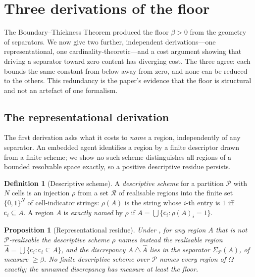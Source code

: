 \documentclass[11pt,twocolumn,a4paper]{article}
\theoremstyle{thmstyle}
\newtheorem{proposition}[theorem]{Proposition}
\theoremstyle{definition}
\newtheorem{definition}[theorem]{Definition}
\theoremstyle{remark}
\newcommand{\Space}{\Omega}
\newcommand{\thick}{\beta}
\newcommand{\Part}{\mathscr{P}}
\newcommand{\cell}{\mathsf{c}}
\begin{document}
\section{Three derivations of the floor}
\label{sec:floor}

The Boundary--Thickness Theorem produced the floor $\thick>0$ from the geometry
of separators. We now give two further, independent derivations---one
representational, one cardinality-theoretic---and a cost argument showing that
driving a separator toward zero content has diverging cost. The three agree:
each bounds the same constant from below away from zero, and none can be reduced
to the others. This redundancy is the paper's evidence that the floor is
structural and not an artefact of one formalism.

\subsection{The representational derivation}

The first derivation asks what it costs to \emph{name} a region, independently of
any separator. An embedded agent identifies a region by a finite descriptor
drawn from a finite scheme; we show no such scheme distinguishes all regions of
a bounded resolvable space exactly, so a positive descriptive residue persists.

\begin{definition}[Descriptive scheme]
\label{def:scheme}
A \emph{descriptive scheme} for a partition $\Part$ with $N$ cells is an
injection $\rho$ from a set $\mathcal{R}$ of realisable regions into the finite
set $\{0,1\}^{N}$ of cell-indicator strings: $\rho(A)$ is the string whose
$i$-th entry is $1$ iff $\cell_i\subseteq A$. A region $A$ is
\emph{exactly named} by $\rho$ if $A=\bigcup\{\cell_i:\rho(A)_i=1\}$.
\end{definition}

\begin{proposition}[Representational residue]
\label{prop:rep-residue}
Under , for any region $A$ that is not $\Part$-realisable the
descriptive scheme $\rho$ names instead the realisable region
$\widehat A=\bigcup\{\cell_i:\cell_i\subseteq A\}$, and the discrepancy
$A\,\triangle\,\widehat A$ lies in the separator $\Sigma_\Part(A)$, of measure
$\ge\thick$. No finite descriptive scheme over $\Part$ names every region of
$\Space$ exactly; the unnamed discrepancy has measure at least the floor.
\end{proposition}
\end{document}
